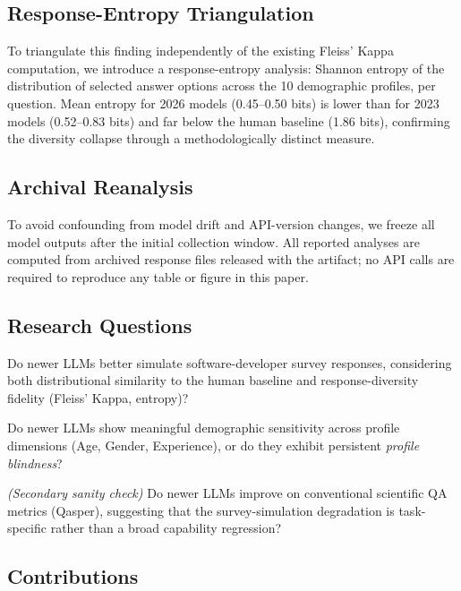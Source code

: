 \documentclass[12pt,a4paper]{article}
\begin{document}
\subsection*{Response-Entropy Triangulation}

To triangulate this finding independently of the existing Fleiss'
Kappa computation, we introduce a response-entropy analysis:
Shannon entropy of the distribution of selected answer options across
the 10 demographic profiles, per question.
Mean entropy for 2026 models (0.45--0.50 bits) is lower than for
2023 models (0.52--0.83 bits) and far below the human baseline
(1.86 bits), confirming the diversity collapse through a
methodologically distinct measure.

\subsection*{Archival Reanalysis}

To avoid confounding from model drift and API-version changes, we
freeze all model outputs after the initial collection window.
All reported analyses are computed from archived response files
released with the artifact; no API calls are required to reproduce
any table or figure in this paper.

\subsection*{Research Questions}

\begin{description}[leftmargin=1.3em,itemsep=2pt]
\item[\textbf{RQ1}] Do newer LLMs better simulate software-developer
  survey responses, considering both distributional similarity to the
  human baseline and response-diversity fidelity (Fleiss' Kappa, entropy)?
\item[\textbf{RQ2}] Do newer LLMs show meaningful demographic
  sensitivity across profile dimensions (Age, Gender, Experience), or
  do they exhibit persistent \emph{profile blindness}?
\item[\textbf{RQ3}] \emph{(Secondary sanity check)} Do newer LLMs
  improve on conventional scientific QA metrics (Qasper), suggesting
  that the survey-simulation degradation is task-specific rather than
  a broad capability regression?
\end{description}

\subsection*{Contributions}
\end{document}
